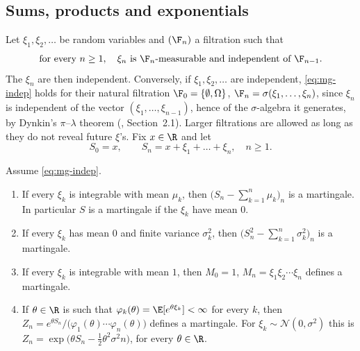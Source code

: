 \subsection*{Sums, products and exponentials}

Let $\xi_1,\xi_2,\dots$ be random variables and $(\F_n)$ a filtration such that
\begin{equation}\label{eq:mg-indep}
  \text{for every } n\ge1,\quad \xi_n \text{ is } \F_n\text{-measurable and independent of } \F_{n-1}.
\end{equation}
The $\xi_n$ are then independent. Conversely, if $\xi_1,\xi_2,\dots$ are independent,
\eqref{eq:mg-indep} holds for their natural filtration $\F_0=\{\emptyset,\Omega\}$,
$\F_n=\sigma(\xi_1,\dots,\xi_n)$, since $\xi_n$ is independent of the vector
$(\xi_1,\dots,\xi_{n-1})$, hence of the $\sigma$-algebra it generates, by Dynkin's
$\pi$--$\lambda$ theorem (\textcite{durrett}, Section~2.1). Larger filtrations are allowed as long as they do not reveal
future $\xi$'s. Fix $x\in\R$ and let
\[
  S_0=x,\qquad S_n=x+\xi_1+\dots+\xi_n,\quad n\ge1 .
\]

\begin{proposition}\label{prop:mg-examples}
Assume \eqref{eq:mg-indep}.
\begin{enumerate}[label=(\roman*)]
  \item If every $\xi_k$ is integrable with mean $\mu_k$, then $\big(S_n-\sum_{k=1}^n\mu_k\big)_n$
    is a martingale. In particular $S$ is a martingale if the $\xi_k$ have mean $0$.
  \item If every $\xi_k$ has mean $0$ and finite variance $\sigma_k^2$, then
    $\big(S_n^2-\sum_{k=1}^n\sigma_k^2\big)_n$ is a martingale.
  \item If every $\xi_k$ is integrable with mean $1$, then $M_0=1$, $M_n=\xi_1\xi_2\cdots\xi_n$
    defines a martingale.
  \item If $\theta\in\R$ is such that $\varphi_k(\theta)=\E[e^{\theta\xi_k}]<\infty$ for every
    $k$, then $Z_n=e^{\theta S_n}/\big(\varphi_1(\theta)\cdots\varphi_n(\theta)\big)$ defines a
    martingale. For $\xi_k\sim\mathcal N(0,\sigma^2)$ this is
    $Z_n=\exp\big(\theta S_n-\tfrac12\theta^2\sigma^2n\big)$, for every $\theta\in\R$.
\end{enumerate}
\end{proposition}

